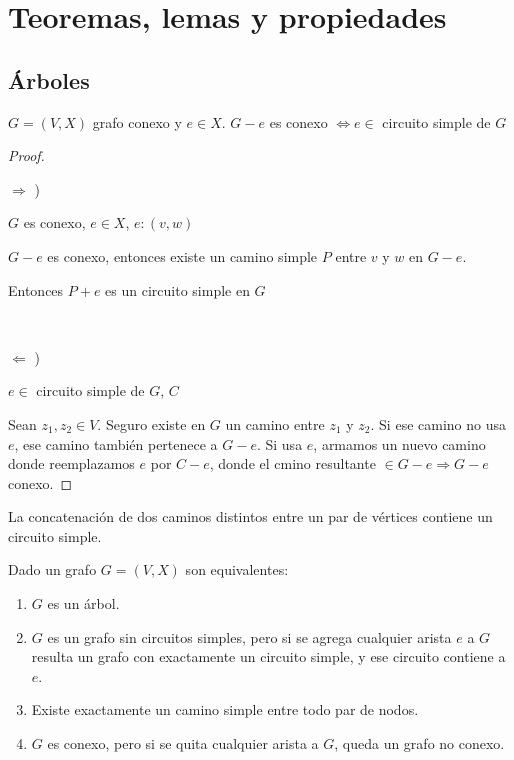 \section{Teoremas, lemas y propiedades}

\subsection{Árboles}

\begin{lema}
\label{eCircSimple}
    $G = (V, X)$ grafo conexo y $e \in X$. $G - e$ es conexo $\Longleftrightarrow e \in$ circuito simple de $G$    

\end{lema}

\begin{proof}
    ~

    $\Longrightarrow$ )

    $G$ es conexo, $e \in X$, $e:(v, w)$

    $G - e$ es conexo, entonces existe un camino simple $P$ entre $v$ y $w$ en $G - e$.

    Entonces $P + e$ es un circuito simple en $G$

    ~

    $\Longleftarrow$ )

    $e \in$ circuito simple de $G$, $C$

    Sean $z_1, z_2 \in V$. Seguro existe en $G$ un camino entre $z_1$ y $z_2$. Si ese camino no usa $e$, ese camino también pertenece a $G - e$. Si usa $e$, armamos un nuevo camino donde reemplazamos $e$ por $C - e$, donde el cmino resultante $\in G - e \Longrightarrow G - e$ conexo.
\end{proof}

\begin{lema}
\label{concatCircSimple}
    La concatenación de dos caminos distintos entre un par de vértices contiene un circuito simple.
\end{lema}

\begin{teo}
    Dado un grafo $G = (V, X)$ son equivalentes:

    \begin{enumerate}
        \item $G$ es un árbol.
        \item $G$ es un grafo sin circuitos simples, pero si se agrega cualquier arista $e$ a $G$resulta un grafo con exactamente un circuito simple, y ese circuito contiene a $e$.
        \item Existe exactamente un camino simple entre todo par de nodos.
        \item $G$ es conexo, pero si se quita cualquier arista a $G$, queda un grafo no conexo.
    \end{enumerate}
\end{teo}

